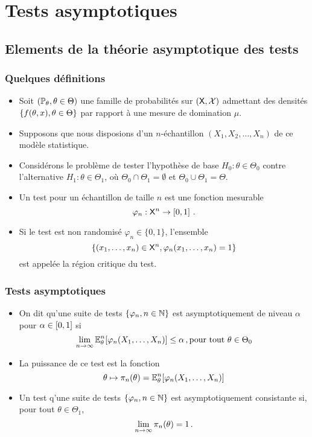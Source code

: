 \section{Tests asymptotiques}
\subsection{Elements de la théorie asymptotique des tests}
\begin{frame}
\frametitle{Quelques définitions}
\begin{itemize}
\item Soit $(\operatorname{{\mathbb P}}_\theta, \theta \in \Theta)$ une famille de probabilités sur $(\mathsf{X},\mathcal{X})$ admettant des densités $\{ f(\theta,x), \theta \in \Theta \}$ par rapport à une mesure de domination $\mu$.
\item Supposons que nous disposions d'un $n$-échantillon $(X_1,X_2,\dots, X_n)$ de ce modèle statistique.
\item Considérons le problème de tester l'hypothèse de base $H_0: \theta \in \Theta_0$ contre l'alternative $H_1: \theta \in \Theta_1$, où $\Theta_0 \cap \Theta_1= \emptyset$ et $\Theta_0 \cup \Theta_1= \Theta$.
\item Un \alert{test} pour un échantillon de taille $n$ est une  fonction mesurable
\[
\varphi_n : \mathsf{X}^n \to \left[0,1\right] \,.
\]
\item Si le test est \alert{non randomisé} $\varphi_n \in \{0,1\}$, l'ensemble
\[
\{ (x_1,\dots, x_n) \in \mathsf{X}^n, \varphi_n(x_1,\dots,x_n)= 1\}
\]
est appelée la \alert{région critique du test}.
\end{itemize}
\end{frame}

\begin{frame}
\frametitle{Tests asymptotiques}
\begin{itemize}
\item  On dit qu'une suite de  tests $\{\varphi_n, n \in \mathbb{N}\}$ est \alert{asymptotiquement de niveau $\alpha$} pour $\alpha \in \left[0,1\right]$ si
\alert{
\[
\lim_{n \to \infty} \operatorname{{\mathbb E}}^n_\theta[ \varphi_n(X_1,\dots,X_n)] \leq \alpha \,, \text{pour tout $\theta \in \Theta_0$}
\]
}
\item La puissance de ce test est la fonction
\[
\theta \mapsto \pi_n(\theta)= \operatorname{{\mathbb E}}^n_{\theta}[ \varphi_n(X_1,\dots,X_n)]
\]
\item Un test q'une suite de tests $\{\varphi_n, n \in \mathbb{N}\}$ est asymptotiquement \alert{consistante} si, pour tout $\theta \in \Theta_1$,
\alert{
\[
\lim_{n \to \infty} \pi_n(\theta) = 1 \,.
\]
}
\end{itemize}
\end{frame}

